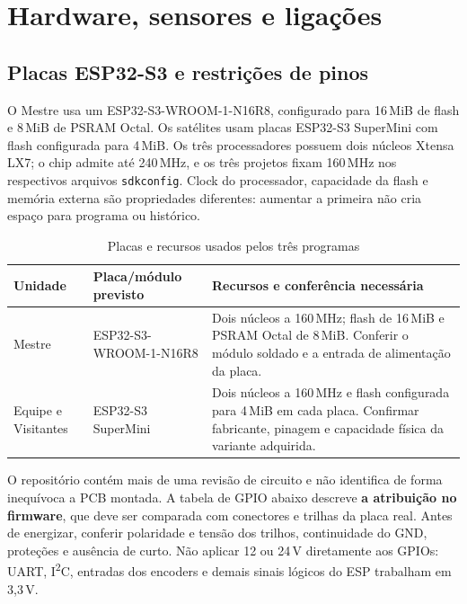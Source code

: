 \chapter{Hardware, sensores e ligações}\label{cap:hardware}
\section{Placas ESP32-S3 e restrições de pinos}
O Mestre usa um ESP32-S3-WROOM-1-N16R8, configurado para 16\,MiB de flash e 8\,MiB de PSRAM Octal. Os satélites usam placas ESP32-S3 SuperMini com flash configurada para 4\,MiB. Os três processadores possuem dois núcleos Xtensa LX7; o chip admite até 240\,MHz, e os três projetos fixam 160\,MHz nos respectivos arquivos \texttt{sdkconfig}. Clock do processador, capacidade da flash e memória externa são propriedades diferentes: aumentar a primeira não cria espaço para programa ou histórico.

\begin{table}[htbp]\centering\small
\caption{Placas e recursos usados pelos três programas}\label{tab:modelos-esp}
\begin{tabularx}{\textwidth}{@{}p{2.5cm}p{4.2cm}X@{}}\toprule
Unidade & Placa/módulo previsto & Recursos e conferência necessária\\\midrule
Mestre & ESP32-S3-WROOM-1-N16R8 & Dois núcleos a 160\,MHz; flash de 16\,MiB e PSRAM Octal de 8\,MiB. Conferir o módulo soldado e a entrada de alimentação da placa.\\
Equipe e Visitantes & ESP32-S3 SuperMini & Dois núcleos a 160\,MHz e flash configurada para 4\,MiB em cada placa. Confirmar fabricante, pinagem e capacidade física da variante adquirida.\\\bottomrule
\end{tabularx}\end{table}

O repositório contém mais de uma revisão de circuito e não identifica de forma inequívoca a PCB montada. A tabela de GPIO abaixo descreve \textbf{a atribuição no firmware}, que deve ser comparada com conectores e trilhas da placa real. Antes de energizar, conferir polaridade e tensão dos trilhos, continuidade do GND, proteções e ausência de curto. Não aplicar 12 ou 24\,V diretamente aos GPIOs: UART, I\textsuperscript{2}C, entradas dos encoders e demais sinais lógicos do ESP trabalham em 3,3\,V.

